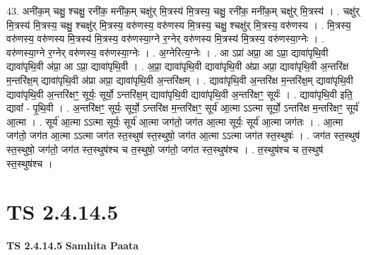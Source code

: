 \documentclass[17pt]{extarticle}
\begin{document}
43. अनी॑क॒म् चक्षु॒ श्चक्षु॒ रनी॑क॒ मनी॑क॒म् चक्षु॑र् मि॒त्रस्य॑ मि॒त्रस्य॒ चक्षु॒ रनी॑क॒ मनी॑क॒म् चक्षु॑र् मि॒त्रस्य॑ । . चक्षु॑र् मि॒त्रस्य॑ मि॒त्रस्य॒ चक्षु॒ श्चक्षु॑र् मि॒त्रस्य॒ वरु॑णस्य॒ वरु॑णस्य मि॒त्रस्य॒ चक्षु॒ श्चक्षु॑र् मि॒त्रस्य॒ वरु॑णस्य । . मि॒त्रस्य॒ वरु॑णस्य॒ वरु॑णस्य मि॒त्रस्य॑ मि॒त्रस्य॒ वरु॑णस्या॒ग्ने र॒ग्नेर् वरु॑णस्य मि॒त्रस्य॑ मि॒त्रस्य॒ वरु॑णस्या॒ग्नेः । . वरु॑णस्या॒ग्ने र॒ग्नेर् वरु॑णस्य॒ वरु॑णस्या॒ग्नेः । . अ॒ग्नेरित्य॒ग्नेः । . आ ऽप्रा॑ अप्रा॒ आ ऽप्रा॒ द्यावा॑पृथि॒वी द्यावा॑पृथि॒वी अ॑प्रा॒ आ ऽप्रा॒ द्यावा॑पृथि॒वी । . अ॒प्रा॒ द्यावा॑पृथि॒वी द्यावा॑पृथि॒वी अ॑प्रा अप्रा॒ द्यावा॑पृथि॒वी अ॒न्तरि॑क्ष म॒न्तरि॑क्ष॒म् द्यावा॑पृथि॒वी अ॑प्रा अप्रा॒ द्यावा॑पृथि॒वी अ॒न्तरि॑क्षम् । . द्यावा॑पृथि॒वी अ॒न्तरि॑क्ष म॒न्तरि॑क्ष॒म् द्यावा॑पृथि॒वी द्यावा॑पृथि॒वी अ॒न्तरि॑क्षꣳ॒॒ सूर्यः॒ सूर्यो॒ ऽन्तरि॑क्ष॒म् द्यावा॑पृथि॒वी द्यावा॑पृथि॒वी अ॒न्तरि॑क्षꣳ॒॒ सूर्यः॑ । . द्यावा॑पृथि॒वी इति॒ द्यावा᳚ - पृ॒थि॒वी । . अ॒न्तरि॑क्षꣳ॒॒ सूर्यः॒ सूर्यो॒ ऽन्तरि॑क्ष म॒न्तरि॑क्षꣳ॒॒ सूर्य॑ आ॒त्मा ऽऽत्मा सूर्यो॒ ऽन्तरि॑क्ष म॒न्तरि॑क्षꣳ॒॒ सूर्य॑ आ॒त्मा । . सूर्य॑ आ॒त्मा ऽऽत्मा सूर्यः॒ सूर्य॑ आ॒त्मा जग॑तो॒ जग॑त आ॒त्मा सूर्यः॒ सूर्य॑ आ॒त्मा जग॑तः । . आ॒त्मा जग॑तो॒ जग॑त आ॒त्मा ऽऽत्मा जग॑त स्त॒स्थुष॑ स्त॒स्थुषो॒ जग॑त आ॒त्मा ऽऽत्मा जग॑त स्त॒स्थुषः॑ । . जग॑त स्त॒स्थुष॑ स्त॒स्थुषो॒ जग॑तो॒ जग॑त स्त॒स्थुष॑श्च च त॒स्थुषो॒ जग॑तो॒ जग॑त स्त॒स्थुष॑श्च । . त॒स्थुष॑श्च च त॒स्थुष॑ स्त॒स्थुष॑श्च । \newline
\pagebreak
{}

\section{ TS 2.4.14.5 }

\textbf{TS 2.4.14.5 } \newline
\textbf{Samhita Paata} \newline
\end{document}
